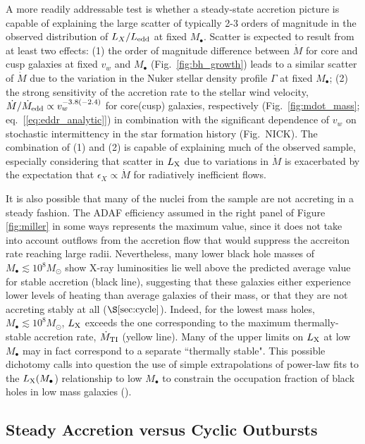 \documentclass[usenatbib,fleqn]{mn2e}
\begin{document}
A more readily addressable test is whether a steady-state accretion
picture is capable of explaining the large scatter of typically 2-3
orders of magnitude in the observed distribution of $L_{X}/L_{\rm
  edd}$ at fixed $M_{\bullet}$.  Scatter is expected to result from at
least two effects: (1) the order of magnitude difference between
$\dot{M}$ for core and cusp galaxies at fixed $v_w$ and $M_{\bullet}$
(Fig.~\ref{fig:bh_growth}) leads to a similar scatter of $\dot{M}$ due
to the variation in the Nuker stellar density profile $\Gamma$ at
fixed $M_{\bullet}$; (2) the strong sensitivity of the accretion rate
to the stellar wind velocity, $\dot{M}/\dot{M}_{\rm edd} \propto
v_{w}^{-3.8(-2.4)}$ for core(cusp) galaxies, respectively
(Fig.~\ref{fig:mdot_mass}; eq.~[\ref{eq:eddr_analytic}]) in
combination with the significant dependence of $v_w$ on stochastic
intermittency in the star formation history (Fig.~NICK).  The
combination of (1) and (2) is capable of explaining much of the
observed sample, especially considering that scatter in $L_{\rm X}$
due to variations in $\dot{M}$ is exacerbated by the expectation that
$\epsilon_{X} \propto \dot{M}$ for radiatively inefficient flows.

It is also possible that many of the nuclei from the \citet{Miller+15}
sample are not accreting in a steady fashion.  The ADAF efficiency
assumed in the right panel of Figure \ref{fig:miller} in some ways
represents the maximum value, since it does not take into account
outflows from the accretion flow that would suppress the accreiton
rate reaching large radii.  Nevertheless, many lower black hole masses
of $M_{\bullet} \lesssim 10^{8}M_{\odot}$ show X-ray luminosities lie
well above the predicted average value for stable accretion (black
line), suggesting that these galaxies either experience lower levels
of heating than average galaxies of their mass, or that they are not
accreting stably at all ($\S\ref{sec:cycle}$).  Indeed, for the lowest
mass holes, $M_{\bullet} \lesssim 10^{8}M_{\odot}$, $L_{\rm X}$
exceeds the one corresponding to the maximum thermally-stable
accretion rate, $\dot{M}_{\rm TI}$ (yellow line).  Many of the upper
limits on $L_{\rm X}$ at low $M_{\bullet}$ may in fact correspond to a
separate ``thermally stable".  This possible dichotomy calls into
question the use of simple extrapolations of power-law fits to the
$L_{\rm X}(M_{\bullet}$) relationship to low $M_{\bullet}$ to
constrain the occupation fraction of black holes in low mass galaxies
(\citealt{Miller+15}).


\subsection{Steady Accretion versus Cyclic Outbursts}
\label{sec:cycle}
\end{document}
